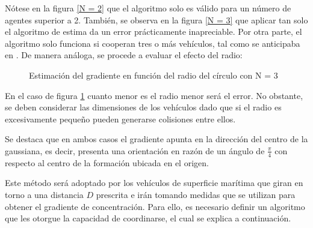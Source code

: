 Nótese en la figura \ref{N = 2} que el algoritmo solo es válido para un número de agentes superior a 2. También, se observa en la figura \ref{N = 3} que aplicar tan solo el algoritmo de estima da un error prácticamente inapreciable. Por otra parte, el algoritmo solo funciona si cooperan tres o más vehículos, tal como se anticipaba en \cite{Estimacion_Gradiente}. De manera análoga, se procede a evaluar el efecto del radio:

\begin{figure}[H]
  \begin{center}
    \caption{Estimación del gradiente en función del radio del círculo con N = 3}
    \label{VARD}
  \end{center}
\end{figure}

En el caso de figura \ref{VARD} cuanto menor es el radio menor será el error. No obstante, se deben considerar las dimensiones de los vehículos dado que si el radio es excesivamente pequeño pueden generarse colisiones entre ellos.

Se destaca que en ambos casos el gradiente apunta en la dirección del centro de la gaussiana, es decir, presenta una orientación en razón de un ángulo de $\frac{\pi}{4}$ con respecto al centro de la formación ubicada en el origen.

Este método será adoptado por los vehículos de superficie marítima que giran en torno a una distancia $D$ prescrita e irán tomando medidas que se utilizan para obtener el gradiente de concentración. Para ello, es necesario definir un algoritmo que les otorgue la capacidad de coordinarse, el cual se explica a continuación.

